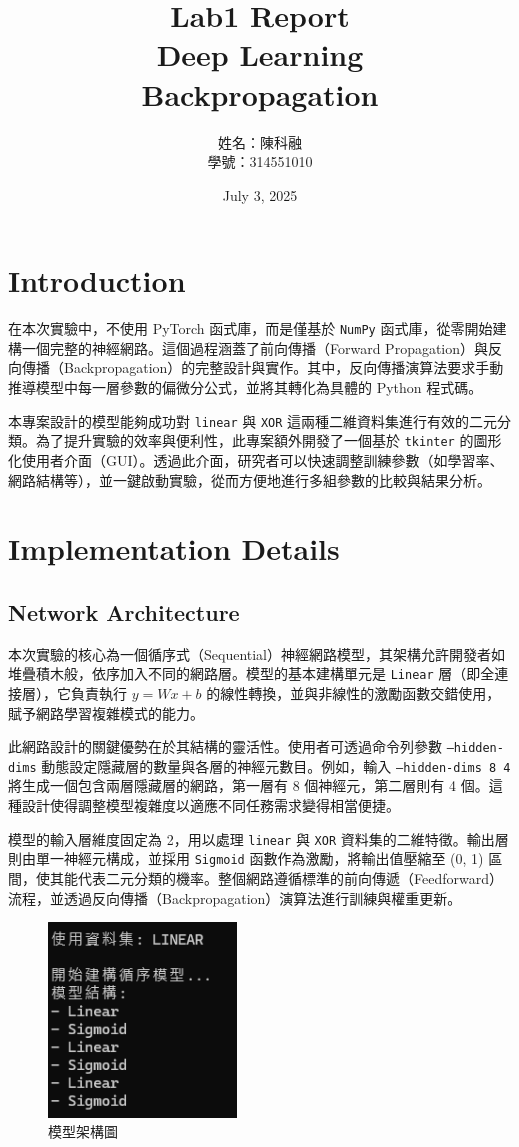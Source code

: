 \documentclass{article}
\title{
  Lab1 Report\\[0.5em]
  \large Deep Learning\\
  \large Backpropagation
}
\author{
  姓名：陳科融 \\
  學號：314551010
}
\date{July 3, 2025}
\begin{document}
\maketitle
 
\section{Introduction}

    在本次實驗中，不使用 PyTorch 函式庫，而是僅基於 \texttt{NumPy} 函式庫，從零開始建構一個完整的神經網路。這個過程涵蓋了前向傳播（Forward Propagation）與反向傳播（Backpropagation）的完整設計與實作。其中，反向傳播演算法要求手動推導模型中每一層參數的偏微分公式，並將其轉化為具體的 Python 程式碼。

本專案設計的模型能夠成功對 \texttt{linear} 與 \texttt{XOR} 這兩種二維資料集進行有效的二元分類。為了提升實驗的效率與便利性，此專案額外開發了一個基於 \texttt{tkinter} 的圖形化使用者介面（GUI）。透過此介面，研究者可以快速調整訓練參數（如學習率、網路結構等），並一鍵啟動實驗，從而方便地進行多組參數的比較與結果分析。


\section{Implementation Details}

\subsection{Network Architecture}
本次實驗的核心為一個循序式（Sequential）神經網路模型，其架構允許開發者如堆疊積木般，依序加入不同的網路層。模型的基本建構單元是 \texttt{Linear} 層（即全連接層），它負責執行 \(y = Wx + b\) 的線性轉換，並與非線性的激勵函數交錯使用，賦予網路學習複雜模式的能力。

此網路設計的關鍵優勢在於其結構的靈活性。使用者可透過命令列參數 \texttt{--hidden-dims} 動態設定隱藏層的數量與各層的神經元數目。例如，輸入 \texttt{--hidden-dims 8 4} 將生成一個包含兩層隱藏層的網路，第一層有 8 個神經元，第二層則有 4 個。這種設計使得調整模型複雜度以適應不同任務需求變得相當便捷。

模型的輸入層維度固定為 2，用以處理 \texttt{linear} 與 \texttt{XOR} 資料集的二維特徵。輸出層則由單一神經元構成，並採用 \texttt{Sigmoid} 函數作為激勵，將輸出值壓縮至 (0, 1) 區間，使其能代表二元分類的機率。整個網路遵循標準的前向傳遞（Feedforward）流程，並透過反向傳播（Backpropagation）演算法進行訓練與權重更新。

\begin{figure}[htp]
    \centering
    \includegraphics[width=5cm]{Lab01_report/img/2.1.png}
    \caption{模型架構圖}
    \label{fig:model}
\end{figure}
\end{document}
